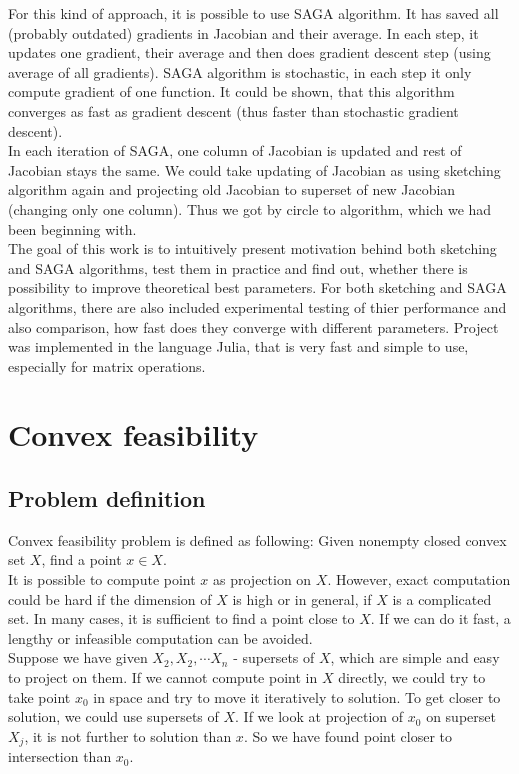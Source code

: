 \documentclass[11pt]{book}
\begin{document}
For this kind of approach, it is possible to use SAGA algorithm. It has saved all (probably outdated) gradients in Jacobian and their average. In each step, it updates one gradient, their average and then does gradient descent step (using average of all gradients). SAGA algorithm is stochastic, in each step it only compute gradient of one function. It could be shown, that this algorithm converges as fast as gradient descent (thus faster than stochastic gradient descent).\\

In each iteration of SAGA, one column of Jacobian is updated and rest of Jacobian stays the same. We could take updating of Jacobian as using sketching algorithm again and projecting old Jacobian to superset of new Jacobian (changing only one column). Thus we got by circle to algorithm, which we had been beginning with.\\

The goal of this work is to intuitively present motivation behind both sketching and SAGA algorithms, test them in practice and find out, whether there is possibility to improve theoretical best parameters. For both sketching and SAGA algorithms, there are also included experimental testing of thier performance and also comparison, how fast does they converge with different parameters. Project was implemented in the language Julia, that is very fast and simple to use, especially for matrix operations.

\chapter{Convex feasibility}

\section{Problem definition}

Convex feasibility problem is defined as following: Given nonempty closed convex set $X$, find a point $x \in X.$\\

It is possible to compute point $x$ as projection on $X$. However, exact computation could be hard if the dimension of $X$ is high or in general, if $X$ is a complicated set. In many cases, it is sufficient to find a point close to $X$. If we can do it fast, a lengthy or infeasible computation can be avoided.\\

Suppose we have given $X_2 , X_2 , \cdots X_n$ - supersets of $X$, which are simple and easy to project on them. If we cannot compute point in $X$ directly, we could try to take point $x_0$ in space and try to move it iteratively to solution. To get closer to solution, we could use supersets of $X$. If we look at projection of $x_0$ on superset $X_j$, it is not further to solution than $x$. So we have found point closer to intersection than $x_0$.
\end{document}
